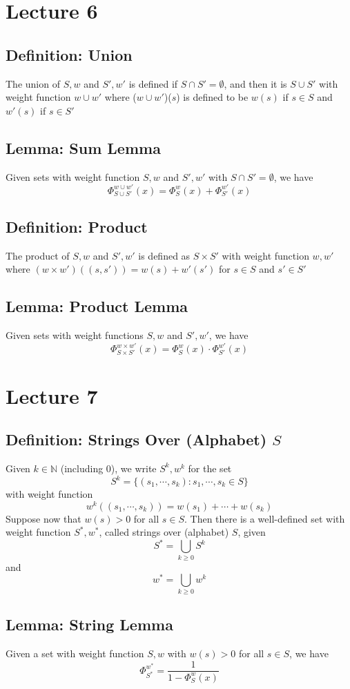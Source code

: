 \documentclass[11pt]{article}
\newcommand{\N}{{\mathbb{N}}}
\begin{document}
\section{Lecture 6}
\subsection{Definition: Union}
The union of $S, w$ and $S', w'$ is defined if $S\cap S' = \emptyset$, and then it is $S\cup S'$ with weight function $w\cup w'$ where 
($w\cup w'$)($s$) is defined to be $w(s)$ if $s\in S$ and $w'(s)$ if $s\in S'$ 
\subsection{Lemma: Sum Lemma}
Given sets with weight function $S,w$ and $S',w'$ with $S\cap S' = \emptyset$, we have 
\[\Phi_{S\cup S'}^{w\cup w'}(x) = \Phi_S^w(x) + \Phi_{S'}^{w'}(x)\]
\subsection{Definition: Product}
The product of $S,w$ and $S',w'$ is defined as $S\times S'$ with weight function $w,w'$ where $(w\times w')((s,s')) = w(s)+w'(s')$ for $s\in S$ and $s'\in S'$
\subsection{Lemma: Product Lemma}
Given sets with weight functions $S,w$ and $S',w'$, we have 
\[\Phi_{S\times S'}^{w\times w'}(x) = \Phi_S^w(x) \cdot \Phi_{S'}^{w'}(x)\]

\section{Lecture 7}
\subsection{Definition: Strings Over (Alphabet) $S$}
Given $k\in\N$ (including 0), we write $S^k,w^k$ for the set 
\[S^k = \{(s_1,\cdots,s_k):s_1,\cdots,s_k\in S\}\]
with weight function 
\[w^k((s_1,\cdots,s_k)) = w(s_1)+\cdots+w(s_k)\]
Suppose now that $w(s)>0$ for all $s\in S$. Then there is a well-defined set with weight function $S^*,w^*$, called strings over (alphabet) $S$, given 
\[S^* = \bigcup_{k\geq0}S^k\]
and
\[w^* = \bigcup_{k\geq0}w^k\]
\subsection{Lemma: String Lemma}
Given a set with weight function $S,w$ with $w(s)>0$ for all $s\in S$, we have 
\[\Phi_{S^*}^{w^*} = \frac{1}{1-\Phi_S^w(x)}\]
\end{document}

